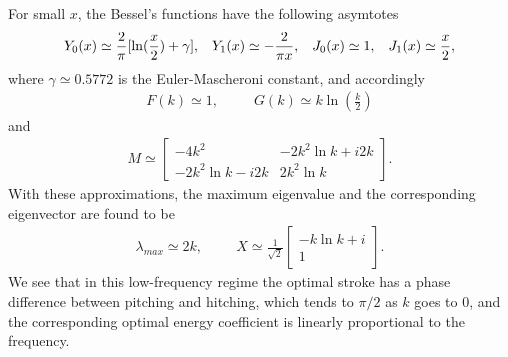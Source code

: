 For small $x$, the Bessel's functions have the following asymtotes
\begin{align}
Y_0(x)  \simeq  \frac{2}{\pi}[\ln (\frac{x}{2}) + \gamma],  \hspace{3mm} 
Y_1(x)  \simeq  -\frac{2}{\pi x}, \hspace{3mm}
J_0(x) \simeq 1, \hspace{3mm}
J_1(x) \simeq \frac{x}{2},
\end{align}
where $\gamma \simeq 0.5772$ is the Euler-Mascheroni constant, and accordingly
\begin{align}
F(k) \simeq 1,  \hspace{30pt}   G(k) \simeq k \ln (\frac{k}{2})
\end{align}
and
\begin{align}
M \simeq \begin{bmatrix} 
-4k^2   &  -2k^2 \ln k + i2k  \\
-2k^2 \ln k - i2k  &   2k^2 \ln k 
\end{bmatrix}.
\end{align}
With these approximations, the maximum eigenvalue and the corresponding eigenvector are found to be
\begin{align}
\lambda_{max} \simeq 2k,   \hspace{1cm}
X \simeq   \frac{1}{\sqrt{2}}
\begin{bmatrix} -k \ln k + i \\  1   \end{bmatrix}.
\end{align}
We see that in this low-frequency regime the optimal stroke has a phase difference between pitching and hitching, which tends to $\pi/2$ as $k$ goes to 0, and the corresponding optimal energy coefficient is linearly proportional to the frequency.

